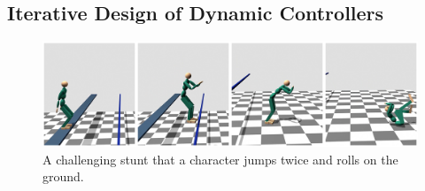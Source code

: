 
\subsection{Iterative Design of Dynamic Controllers}
\begin{figure}[h]
  \begin{center}
    \includegraphics[width=1.0\textwidth]{images/intro_drop_roll}
  \end{center}
  \caption{A challenging stunt that a character jumps twice and rolls
    on the ground.}
  \label{fig:intro_drop_roll}
\end{figure}

